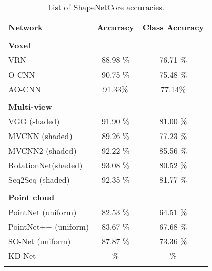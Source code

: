 \begin{table}[]
	\centering
	\begin{tabular}{lcc}
		\hline
		\textbf{Network}       & \textbf{Accuracy} & \textbf{Class Accuracy} \\ \hline
		                       &                    &                              \\
		\textbf{Voxel }        &                    &                              \\
		VRN                    &      88.98 \%      &           76.71 \%           \\
		O-CNN                  &      90.75 \%      &           75.48 \%           \\
		AO-CNN                 &      91.33\%       &           77.14\%            \\\hline
		                       &                    &                              \\
		\textbf{Multi-view }   &                    &                              \\
		VGG (shaded)           &      91.90 \%      &           81.00 \%           \\
		MVCNN (shaded)         &      89.26 \%      &           77.23 \%           \\
		MVCNN2 (shaded)        &      92.22 \%      &           85.56 \%           \\
		RotationNet(shaded)    &      93.08 \%      &           80.52 \%           \\
		Seq2Seq (shaded)       &      92.35 \%      &           81.77 \%           \\\hline
		                       &                    &                              \\
		\textbf{Point cloud  } &                    &                              \\
		PointNet (uniform)     &      82.53 \%      &           64.51 \%           \\
		PointNet++ (uniform)   &      83.67 \%      &           67.68 \%           \\
		SO-Net (uniform)       &      87.87 \%      &           73.36 \%           \\
		KD-Net                 &         \%         &              \%              \\\hline
		                       &                    &                              \\ 
	\end{tabular}
\caption{List of ShapeNetCore accuracies.}
\label{Table:saccs}
\end{table}
